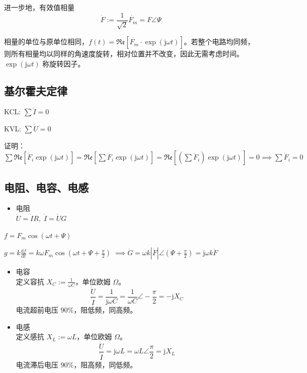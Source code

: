 \documentclass[12pt, a4paper, UTF8, openany]{ctexbook}
\newcommand{\dif}{\mathrm{d}}
\newcommand{\unit}{\mathrm{j}}
\newcommand{\re}{\mathfrak{Re}}
\begin{document}
        进一步地，有效值相量 $$\dot{F} := \frac{1}{\sqrt{2}} \dot{F_m} = F\angle\Psi$$

        相量的单位与原单位相同，$f(t) = \re[\dot{F_m} \cdot \exp(\unit \omega t)]$。若整个电路均同频，则所有相量均以同样的角速度旋转，相对位置并不改变，因此无需考虑时间。$\exp(\unit \omega t)$ 称旋转因子。

        \subsection{基尔霍夫定律}
        KCL: $\sum \dot{I} = 0$

        KVL: $\sum \dot{U} = 0$

        证明：$\sum \re[ \dot{F}_i \exp(\unit \omega t) ] = \re[ \sum \dot{F}_i \exp(\unit \omega t) ] = \re[ (\sum \dot{F}_i) \exp(\unit \omega t) ] = 0 \implies \sum \dot{F}_i = 0$

        \subsection{电阻、电容、电感}
        \begin{itemize}
            \item 电阻 \\
                $\dot{U} = \dot{I} R, \; \dot{I} = \dot{U} G$
        \end{itemize}

        $f = F_m \cos(\omega t + \Psi)$

        $g = k\frac{\dif f}{\dif t} = k\omega F_m \cos(\omega t + \Psi + \frac{\pi}{2}) \; \implies \dot{G} = \omega k |\dot{F}|\angle (\Psi + \frac{\pi}{2}) = \unit \omega k \dot{F}$

        \begin{itemize}
            \item 电容 \\
                定义容抗 $X_C := \frac{1}{\omega C}$，单位欧姆 $\Omega$。
                $$\frac{\dot{U}}{\dot{I}} = \frac{1}{\unit \omega C} = \frac{1}{\omega C} \angle -\frac{\pi}{2} = -\unit X_C$$
                电流超前电压 $90\%$，阻低频，同高频。
            \item 电感 \\
                定义感抗 $X_L := \omega L$，单位欧姆 $\Omega$。
                $$\frac{\dot{U}}{\dot{I}} = \unit \omega L = \omega L \angle \frac{\pi}{2} = \unit X_L$$
                电流滞后电压 $90\%$，阻高频，同低频。
        \end{itemize}
        
\end{document}
